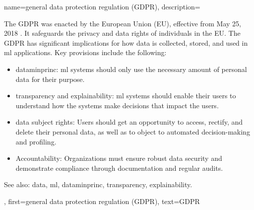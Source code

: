 {name={general data protection regulation (GDPR)},
	description={
			The GDPR
			was enacted by the European Union (EU), effective from May 25, 2018 \cite{GDPR2016}. 
			It safeguards the privacy and \gls{data} rights of individuals in the EU. 
			The GDPR has significant implications for how \gls{data} is collected, stored, and used in \gls{ml}  
			applications. Key provisions include the following:
			\begin{itemize}
				\item \Gls{dataminprinc}: \gls{ml} systems should only use the necessary amount of personal 
				\gls{data} for their purpose.
				\item \Gls{transparency} and \gls{explainability}: \gls{ml} systems should enable their users to 
				understand how the systems make decisions that impact the users.
				\item \Gls{data} subject rights: Users should get an opportunity to access, rectify, and delete their personal \gls{data}, as well as to object to automated decision-making and profiling.
				\item Accountability: Organizations must ensure robust \gls{data} security and demonstrate 
				compliance through documentation and regular audits.
			\end{itemize}
		See also: \gls{data}, \gls{ml}, \gls{dataminprinc}, \gls{transparency}, \gls{explainability}.}, 
	first={general data protection regulation (GDPR)},
	text={GDPR}
}
	
